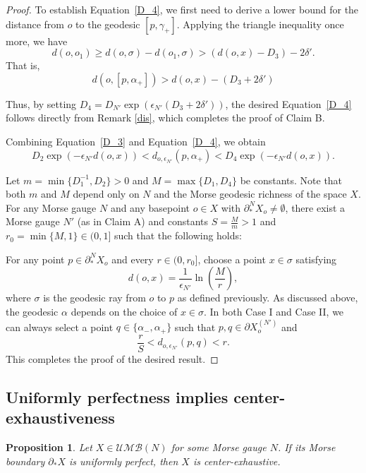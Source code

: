 \documentclass[a4paper,11pt,oneside]{article}
\newtheorem{Proposition}[Theorem]{Proposition}
\begin{document}
\begin{proof}
To establish Equation~\eqref{D_4}, we first need to derive a lower bound for the distance from $o$ to the geodesic $[p, \gamma_+]$. Applying the triangle inequality once more, we have  
\[
d(o, o_1)\ge d(o, \sigma)-d(o_1, \sigma)> (d(o, x)-D_3)-2\delta'.
\]
That is, \[d(o, [p, \alpha_+])>d(o, x)-(D_3+2\delta')\]

Thus, by setting $D_4=D_{N'}\exp\left(\epsilon_{N'}(D_3+2\delta')\right)$, the desired Equation~\eqref{D_4} follows directly from Remark \ref{dis}, which completes the proof of Claim B.

Combining Equation~\eqref{D_3} and Equation~\eqref{D_4}, we obtain
\[
D_2\exp\left(-\epsilon_{N'}d(o, x)\right)<d_{o, \epsilon_{N'}}(p, \alpha_+)< D_4\exp\left(-\epsilon_{N'}d(o, x)\right).
\]

Let $m=\min\{D_1^{-1}, D_2\}>0$ and $M=\max\{D_1,D_4\}$ be constants. Note that both $m$ and $M$ depend only on $N$ and the Morse geodesic richness of the space $X$. For any Morse gauge $N$ and any basepoint $o\in X$ with $\partial_*^NX_o\neq\emptyset$, there exist a Morse gauge $N'$ (as in Claim A) and constants $\displaystyle{S=\frac{M}{m}>1}$ and $\displaystyle{r_0=\min\{M, 1\}}\in(0, 1]$ such that the following holds:

For any point $p\in\partial_*^NX_o$ and every $r\in (0, r_0]$, choose a point $x\in \sigma$ satisfying 
\[
d(o, x)=\frac{1}{\epsilon_{N'}}\ln\left(\frac{M}{r}\right),
\]
where $\sigma$ is the geodesic ray from $o$ to $p$ as defined previously. As discussed above, the geodesic $\alpha$ depends on the choice of $x\in \sigma$. In both Case I and Case II, we can always select a point $q\in \{\alpha_-, \alpha_+\}$ such that $p, q\in \partial X^{(N')}_o$ and
\[
\frac{r}{S}<d_{o,\epsilon_{N'}}(p,q)<r.
\]
This completes the proof of the desired result.

   
\end{proof}

\subsection{Uniformly perfectness implies center-exhaustiveness}

\begin{Proposition}
    Let $X\in\mathcal{UMB}(N)$ for some Morse gauge $N$. If its Morse boundary $\partial_*X$ is uniformly perfect, then $X$ is center-exhaustive.  
\end{Proposition}
\end{document}

